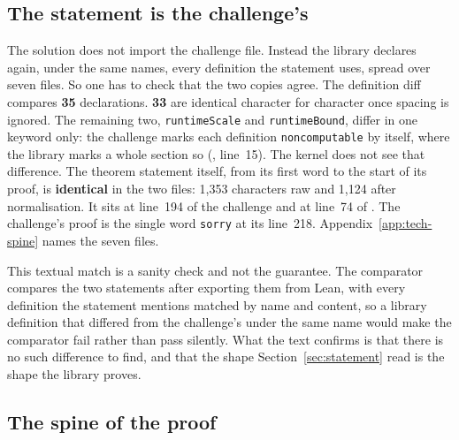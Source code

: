 \begin{table}[t]
\centering\small
\caption{The inspection in numbers. Each row is one count over the
3,091 files of the closure, comments stripped where a keyword is
counted; the script column says which script produced it. Regenerate:
\texttt{python3 -I paper3/scripts/proof\_inspection.py}.}
\label{tab:proof-inspection}

\end{table}

\subsection{The statement is the challenge's}
\label{sec:proof-match}

The solution does not import the challenge file. Instead the library
declares again, under the same names, every definition the statement
uses, spread over seven files. So one has to check that the two copies
agree. The definition diff compares \textbf{35} declarations.
\textbf{33} are identical character for character once spacing is
ignored. The remaining two, \texttt{runtimeScale} and
\texttt{runtimeBound}, differ in one keyword only: the challenge marks each
definition \texttt{noncomputable} by itself, where the library marks a
whole section so (, line~15). The kernel does not see that
difference. The theorem statement itself, from
its first word to the start of its proof, is \textbf{identical} in the
two files: 1,353 characters raw and 1,124 after normalisation. It sits at
line~194 of the challenge and at line~74 of
. The challenge's proof is the single
word \texttt{sorry} at its line~218. Appendix~\ref{app:tech-spine} names
the seven files.

This textual match is a sanity check and not the guarantee. The
comparator \citep{LeanComparator} compares the two statements after
exporting them from Lean, with every definition the statement mentions
matched by name and content, so a library definition that differed from
the challenge's under the same name would make the comparator fail
rather than pass silently. What the text confirms is that there is no
such difference to find, and that the shape Section~\ref{sec:statement}
read is the shape the library proves.

\subsection{The spine of the proof}
\label{sec:proof-spine}

